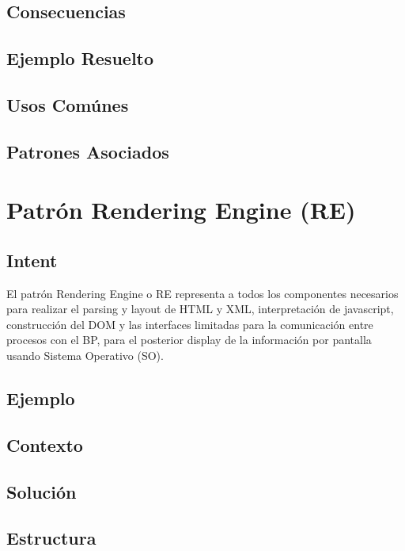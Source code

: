 \subsection*{Consecuencias}

\subsection*{Ejemplo Resuelto}

\subsection*{Usos Comúnes}

\subsection*{Patrones Asociados}

\newpage

\section{Patrón Rendering Engine (RE)}
\label{chap4:REPatt}
\subsection*{Intent}
El patrón Rendering Engine o RE representa a todos los componentes necesarios para realizar el parsing y layout de HTML y XML, interpretación de javascript, construcción del DOM y las interfaces limitadas para la comunicación entre procesos con el BP, para el posterior display de la información por pantalla usando Sistema Operativo (SO).


\subsection*{Ejemplo}

\subsection*{Contexto}

\subsection*{Solución}

\subsection*{Estructura}

